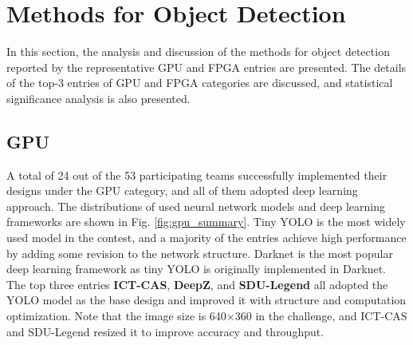 \documentclass[10pt,journal,compsoc]{IEEEtran}
\begin{document}






\section{Methods for Object Detection}

In this section, the analysis and discussion of the methods for object detection reported by the representative GPU and FPGA entries are presented.
The details of the top-3 entries of GPU and FPGA categories are discussed, and statistical significance analysis is also presented.


\subsection{GPU}
A total of 24 out of the 53 participating teams successfully implemented their designs under the GPU category, and all of them adopted deep learning approach.
The distributions of used neural network models and deep learning frameworks are shown in Fig. \ref{fig:gpu_summary}.
Tiny YOLO \cite{redmon2016you} is the most widely used model in the contest, and a majority of the entries achieve high performance by adding some revision to the network structure.
Darknet is the most popular deep learning framework as tiny YOLO is originally implemented in Darknet.
The top three entries \textbf{ICT-CAS}, \textbf{DeepZ}, and \textbf{SDU-Legend} all adopted the YOLO model as the base design and improved it with structure and computation optimization.
Note that the image size is 640$\times$360 in the challenge, and ICT-CAS and SDU-Legend resized it to improve accuracy and throughput.
\end{document}
